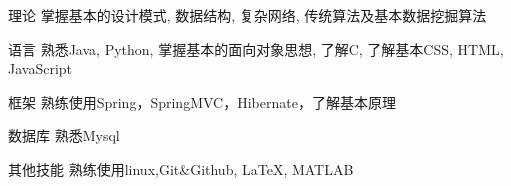\vspace{-5.0mm}

\begin{cvskills}

\cvskill
{理论} %
{掌握基本的设计模式, 数据结构, 复杂网络, 传统算法及基本数据挖掘算法} %

\cvskill
{语言} %
{熟悉Java, Python, 掌握基本的面向对象思想, 了解C, 了解基本CSS, HTML, JavaScript} %


\cvskill
{框架} %
{{熟练使用Spring，SpringMVC，Hibernate，了解基本原理}} %


\cvskill
{数据库} %
{熟悉Mysql} %

\cvskill
{其他技能} %
{熟练使用linux,Git\&Github, LaTeX, MATLAB} %

\end{cvskills}